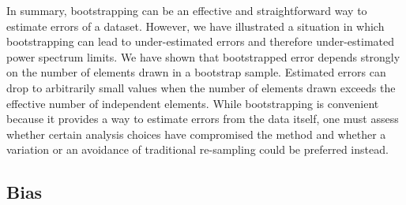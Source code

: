 \documentclass[preprint2,numberedappendix,tighten]{aastex6}  %
\begin{document}
In summary, bootstrapping can be an effective and straightforward way to estimate errors of a dataset. However, we have 
illustrated a situation in which bootstrapping can lead to under-estimated errors and therefore under-estimated power spectrum limits. We have shown that 
bootstrapped error depends strongly on the number of elements drawn in a bootstrap sample. Estimated errors can drop to 
arbitrarily small values when the number of elements drawn exceeds the effective number of independent elements. 
While bootstrapping is convenient because it provides a way to estimate errors from the data itself, one must assess whether certain 
analysis choices have compromised the method and whether a variation or an avoidance of traditional re-sampling could be preferred instead.



\subsection{Bias}
\label{sec:BiasOverview}
\end{document}
